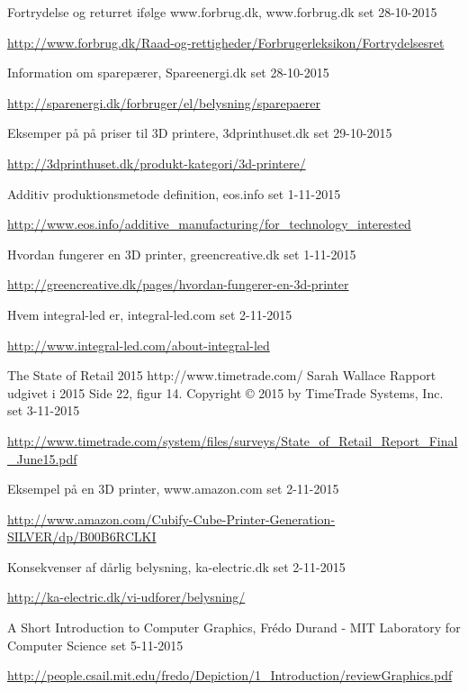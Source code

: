 \begin{thebibliography}{99}
  Fortrydelse og returret ifølge www.forbrug.dk,
  www.forbrug.dk
  set 28-10-2015
  
  \url{http://www.forbrug.dk/Raad-og-rettigheder/Forbrugerleksikon/Fortrydelsesret}
  
  Information om sparepærer,
  Spareenergi.dk
  set 28-10-2015
  
  \url{http://sparenergi.dk/forbruger/el/belysning/sparepaerer}

  Eksemper på på priser til 3D printere,
  3dprinthuset.dk
  set 29-10-2015
  
  \url{http://3dprinthuset.dk/produkt-kategori/3d-printere/}

  Additiv produktionsmetode definition,
  eos.info
  set 1-11-2015
  
  \url{http://www.eos.info/additive_manufacturing/for_technology_interested}
  
  Hvordan fungerer en 3D printer,
  greencreative.dk
  set 1-11-2015
  
  \url{http://greencreative.dk/pages/hvordan-fungerer-en-3d-printer}

  Hvem integral-led er,
  integral-led.com
  set 2-11-2015
  
  \url{http://www.integral-led.com/about-integral-led}
  
  The State of Retail 2015
  http://www.timetrade.com/
  Sarah Wallace
  Rapport udgivet i 2015
  Side 22, figur 14.
  Copyright © 2015 by TimeTrade Systems, Inc.
  set 3-11-2015
  
  \url{http://www.timetrade.com/system/files/surveys/State_of_Retail_Report_Final_June15.pdf}
  
  Eksempel på en 3D printer,
  www.amazon.com
  set 2-11-2015
  
  \url{http://www.amazon.com/Cubify-Cube-Printer-Generation-SILVER/dp/B00B6RCLKI}

  Konsekvenser af dårlig belysning,
  ka-electric.dk
  set 2-11-2015

  \url{http://ka-electric.dk/vi-udforer/belysning/}

  A Short Introduction to Computer Graphics,
  Frédo Durand - MIT Laboratory for Computer Science
  set 5-11-2015

  \url{http://people.csail.mit.edu/fredo/Depiction/1_Introduction/reviewGraphics.pdf}


\end{thebibliography}
